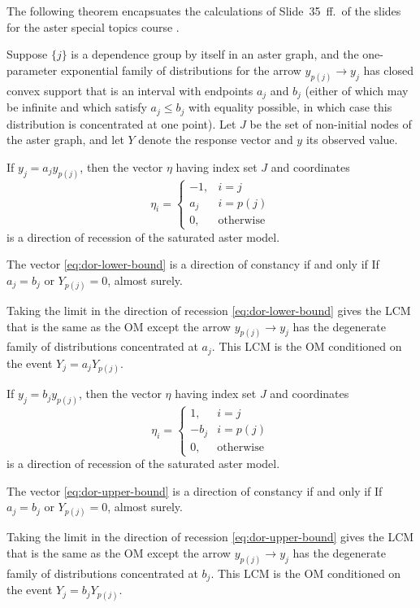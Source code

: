 The following theorem encapsuates the calculations of Slide~35~ff.\ of the
slides for the aster special topics course \citep{geyer-8931-aster}.
\begin{theorem} \label{th:dor-arrow}
Suppose $\{j\}$ is a dependence group by itself in an aster graph, and
the one-parameter exponential family of distributions for the arrow
$y_{p(j)} \longrightarrow y_j$ has closed convex support that is an
interval with endpoints $a_j$ and $b_j$ (either of which may be infinite and
which satisfy $a_j \le b_j$ with equality possible, in which case this
distribution is concentrated at one point).  Let $J$
be the set of non-initial nodes of the aster graph,
and let $Y$ denote the response vector and $y$ its observed value.

If $y_j = a_j y_{p(j)}$, then the vector $\eta$ having index set $J$
and coordinates
\begin{equation} \label{eq:dor-lower-bound}
   \eta_i = \begin{cases} -1, & i = j \\ a_j & i = p(j) \\
   0, & \text{otherwise} \end{cases}
\end{equation}
is a direction of recession of the saturated aster model.

The vector \eqref{eq:dor-lower-bound} is a direction of constancy
if and only if If $a_j = b_j$ or $Y_{p(j)} = 0$, almost surely.

Taking the limit in the direction of recession \eqref{eq:dor-lower-bound}
gives the LCM that is the same as the OM except the arrow
$y_{p(j)} \longrightarrow y_j$ has the degenerate family of distributions
concentrated at $a_j$.
This LCM is the OM conditioned on the event $Y_j = a_j Y_{p(j)}$.

If $y_j = b_j y_{p(j)}$, then the vector $\eta$ having index set $J$
and coordinates
\begin{equation} \label{eq:dor-upper-bound}
   \eta_i = \begin{cases} 1, & i = j \\ - b_j & i = p(j) \\
   0, & \text{otherwise} \end{cases}
\end{equation}
is a direction of recession of the saturated aster model.

The vector \eqref{eq:dor-upper-bound} is a direction of constancy
if and only if If $a_j = b_j$ or $Y_{p(j)} = 0$, almost surely.

Taking the limit in the direction of recession \eqref{eq:dor-upper-bound}
gives the LCM that is the same as the OM except the arrow
$y_{p(j)} \longrightarrow y_j$ has the degenerate family of distributions
concentrated at $b_j$.
This LCM is the OM conditioned on the event $Y_j = b_j Y_{p(j)}$.
\end{theorem}
